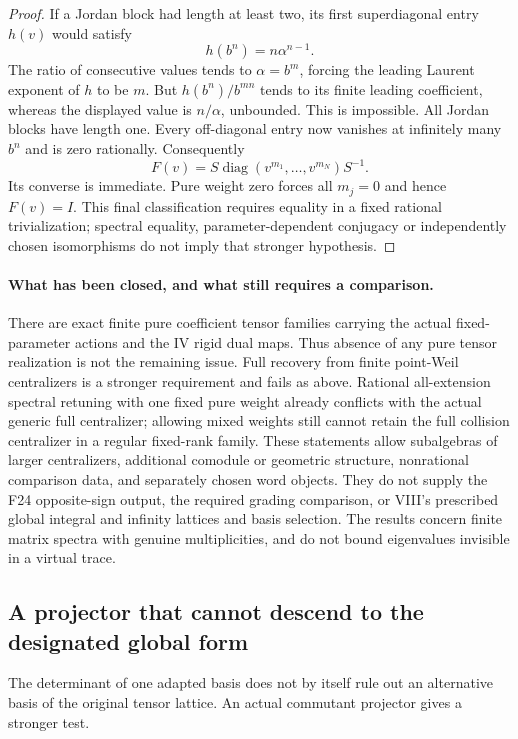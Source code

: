 \documentclass[11pt,a4paper]{article}
\newcommand{\fid}[1]{\textsf{#1}}\newcommand{\gate}[1]{\textsf{#1}}
\theoremstyle{named}\newtheorem{finding}{Finding}[section]
\theoremstyle{definition}\newtheorem{definition}[finding]{Definition}
\theoremstyle{remark}\newtheorem{remark}[finding]{Remark}
\begin{document}
\begin{proof}
If a Jordan block had length at least two, its first
superdiagonal entry $h(v)$ would satisfy
\[
 h(b^n)=n\alpha^{n-1}.
\]
The ratio of consecutive values tends to
$\alpha=b^m$, forcing the leading Laurent exponent
of $h$ to be $m$.
But $h(b^n)/b^{mn}$ tends to its finite leading
coefficient, whereas the displayed value is
$n/\alpha$, unbounded. This is impossible.
All Jordan blocks have length one.
Every off-diagonal entry now vanishes at infinitely
many $b^n$ and is zero rationally.
Consequently
\[
 F(v)=S\operatorname{diag}(v^{m_1},\ldots,v^{m_N})S^{-1}.
\]
Its converse is immediate. Pure weight zero forces
all $m_j=0$ and hence $F(v)=I$.
This final classification requires equality in a
fixed rational trivialization; spectral equality,
parameter-dependent conjugacy or independently chosen
isomorphisms do not imply that stronger hypothesis.
\end{proof}

\paragraph{What has been closed, and what still requires a comparison.}
There are exact finite pure coefficient tensor families
carrying the actual fixed-parameter actions and the IV
rigid dual maps. Thus absence of any pure tensor realization
is not the remaining issue.
Full recovery from finite point-Weil centralizers is a
stronger requirement and fails as above.
Rational all-extension spectral retuning with one fixed
pure weight already conflicts with the actual generic
full centralizer; allowing mixed weights still cannot
retain the full collision centralizer in a regular
fixed-rank family.
These statements allow subalgebras of larger centralizers,
additional comodule or geometric structure, nonrational
comparison data, and separately chosen word objects.
They do not supply the \fid{F24} opposite-sign output,
the required grading comparison, or VIII's prescribed
global integral and infinity lattices and basis selection.
The results concern finite matrix spectra with genuine
multiplicities, and do not bound eigenvalues invisible
in a virtual trace.


\subsection{A projector that cannot descend to the designated global form}
The determinant of one adapted basis does not by itself rule out
an alternative basis of the original tensor lattice. An actual
commutant projector gives a stronger test.
\end{document}
